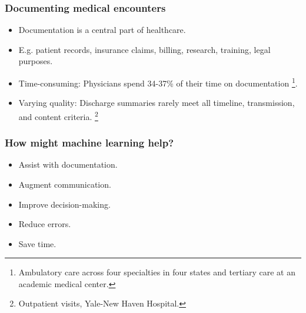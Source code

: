 


\begin{frame}
    \frametitle{Documenting medical encounters}
    \begin{itemize}
        \item <1,2> Documentation is a central part of healthcare.
        \item <1,2> E.g. patient records, insurance claims, billing, research, training, legal purposes.
        \vspace{1em}
        \item <2> {\color{dtured}Time-consuming}: Physicians spend 34-37\% of their time on documentation \cite{joukes_time_2018, tipping_where_2010, sinsky_allocation_2016}\footnote{Ambulatory care across four specialties in four states and tertiary care at an academic medical center.}.
        \item <2> {\color{dtured}Varying quality}: Discharge summaries rarely meet all timeline, transmission, and content criteria. \cite{horwitz_comprehensive_2013}\footnote{Outpatient visits, Yale-New Haven Hospital.}
    \end{itemize}
    
\end{frame}


\begin{frame}
    \frametitle{How might machine learning help?}
    \begin{itemize}
        \item <1> {\color{dtured}Assist} with documentation.
        \item <1> {\color{dtured}Augment} communication.
        \item <1> {\color{dtured}Improve} decision-making.
        \vspace{1em}
        \item <1> {\color{dtured}Reduce} errors.
        \item <1> {\color{dtured}Save} time.
    \end{itemize}
\end{frame}


